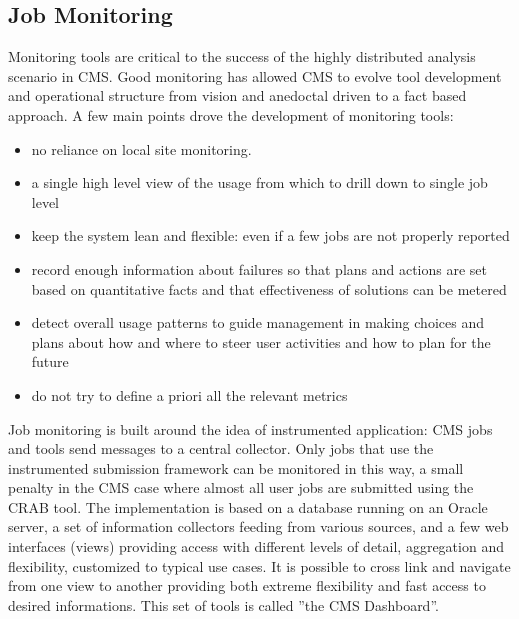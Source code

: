 \subsection{Job Monitoring}
\label{sec:3_3}
Monitoring tools are critical to the success of the
highly distributed analysis scenario in CMS.
Good monitoring has allowed CMS to evolve tool development
and operational structure from vision and anedoctal driven
to a fact based approach.
A few main points drove the development of monitoring tools:
\begin{itemize}
\item no reliance on local site monitoring.
\item a single  high level view of the usage from which
  to drill down to single job level
\item   keep the system lean and flexible: even if a few
  jobs are not properly reported
\item record
  enough information about failures so that plans and actions are set
  based on quantitative facts and that effectiveness of solutions can be metered
\item detect overall usage patterns to guide management in making
 choices and plans about how and where to steer user activities and
 how to plan for the future
\item do not try to define a priori all the relevant metrics
\end{itemize}

Job monitoring is built around the idea of instrumented
application: CMS jobs and tools send messages
to a central collector. Only jobs that use the
instrumented submission framework can be monitored in this way,
a small penalty in the CMS case where almost
all user jobs are submitted using the CRAB tool.
The implementation is based on a
database running on an Oracle server, a set of information collectors
feeding from various sources, 
and a few web interfaces (views) providing access with different levels
of detail, aggregation and flexibility, customized to
typical use cases. It is possible to cross link and navigate
from one view to another providing both extreme flexibility
and fast access to desired informations.
This set of tools is called ''the CMS Dashboard''.

